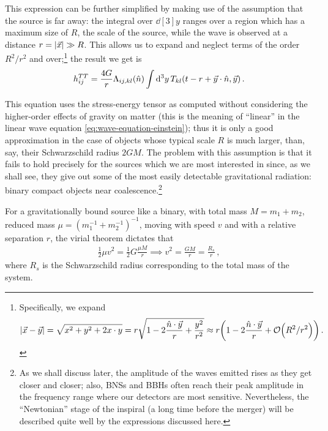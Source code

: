 \documentclass[main.tex]{subfiles}
\begin{document}
This expression can be further simplified by making use of the assumption that the source is far away: the integral over \(\dd[3]{y}\) ranges over a region which has a maximum size of \(R\), the scale of the source, while the wave is observed at a distance \(r = \abs{\vec{x}} \gg R\). 
This allows us to expand and neglect terms of the order \(R^2 / r^2\) and over;\footnote{
    Specifically, we expand 
    \begin{align}
    \abs{\vec{x} - \vec{y}} = \sqrt{x^2 + y^2 + 2 x \cdot y} 
    = r \sqrt{1 - 2 \frac{\hat{n} \cdot \vec{y}}{r} + \frac{y^2}{r^2}}
    \approx r \qty(1 - 2 \frac{\hat{n} \cdot \vec{y}}{r} + \order{R^2/ r^2})
    \,.
    \end{align}
} the result we get is 
%
\begin{align}
h_{ij}^{TT} = \frac{4 G}{r} \Lambda_{ij, kl} (\hat{n})
\int \dd[3]{y} T_{kl} \qty(t-r + \vec{y}\cdot \hat{n}, \vec{y}) 
\,.
\end{align}

This equation uses the stress-energy tensor as computed without considering the higher-order effects of gravity on matter (this is the meaning of ``linear'' in the linear wave equation \eqref{eq:wave-equation-einstein}); thus it is only a good approximation in the case of objects whose typical scale \(R\) is much larger, than, say, their Schwarzschild radius \(2GM\). 
The problem with this assumption is that it fails to hold precisely for the sources which we are most interested in since, as we shall see, they give out some of the most easily detectable gravitational radiation: binary compact objects near coalescence.\footnote{As we shall discuss later, the amplitude of the waves emitted rises as they get closer and closer; also, \acp{BNS} and \acp{BBH} often reach their peak amplitude in the frequency range where our detectors are most sensitive.
Nevertheless, the ``Newtonian'' stage of the inspiral (a long time before the merger) will be described quite well by the expressions discussed here.}

For a gravitationally bound source like a binary, with total mass \(M = m_1 + m_2 \), reduced mass \(\mu = (m_1^{-1} + m_2^{-1})^{-1}\), moving with speed \(v\) and with a relative separation \(r\), the virial theorem dictates that 
%
\begin{align}
\frac{1}{2} \mu v^2 = \frac{1}{2} G \frac{\mu M}{r} \implies v^2 = \frac{GM}{r} = \frac{R_s}{r} 
\,,
\end{align}
% 
where \(R_s\) is the Schwarzschild radius corresponding to the total mass of the system. 
\end{document}
